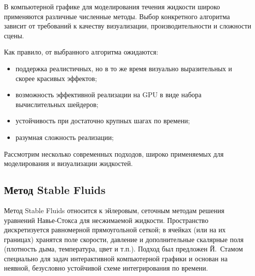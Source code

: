 



В компьютерной графике для моделирования течения жидкости
широко применяются различные численные методы. Выбор конкретного алгоритма
зависит от требований к качеству визуализации, производительности и
сложности сцены.

Как правило, от выбранного алгоритма ожидаются:

\begin{itemize}
      \item поддержка реалистичных, но в то же время
            визуально выразительных и скорее красивых эффектов;
      \item возможность эффективной реализации на GPU
            в виде набора вычислительных шейдеров;
      \item устойчивость при достаточно крупных шагах по времени;
      \item разумная сложность реализации;
\end{itemize}

Рассмотрим несколько современных подходов,
широко применяемых для моделирования и визуализации
жидкостей.

\subsection{Метод Stable Fluids}

Метод Stable Fluids \cite{stamstablefluids} относится к эйлеровым,
сеточным методам решения уравнений Навье-Стокса для
несжимаемой жидкости. Пространство дискретизуется равномерной
прямоугольной сеткой; в ячейках (или на их границах) хранятся
поле скорости, давление и дополнительные скалярные поля
(плотность дыма, температура, цвет и т.п.). Подход был
предложен Й.~Стамом специально для задач интерактивной
компьютерной графики и основан на неявной, безусловно устойчивой
схеме интегрирования по времени.

